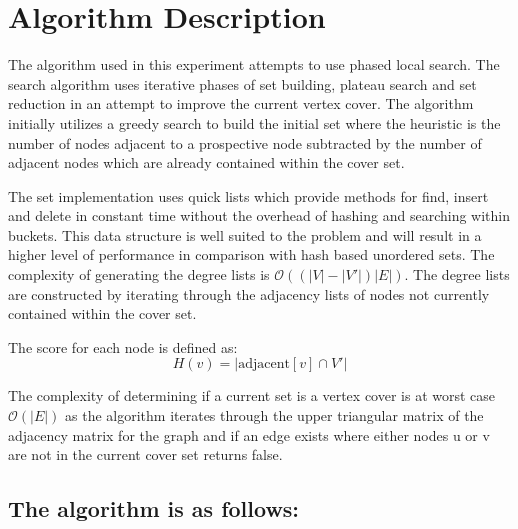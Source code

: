 \documentclass[conference,letterpaper]{IEEEtran}
\begin{document}
\section{Algorithm Description}
\par The algorithm used in this experiment attempts to use phased local search. The search algorithm uses iterative phases of set building, plateau search and set reduction in an attempt to improve the current vertex cover. The algorithm initially utilizes a greedy search to build the initial set where the heuristic is the number of nodes adjacent to a prospective node subtracted by the number of adjacent nodes which are already contained within the cover set.
\par The set implementation uses quick lists which provide methods for find, insert and delete in constant time without the overhead of hashing and searching within buckets. This data structure is well suited to the problem and will result in a higher level of performance in comparison with hash based unordered sets. The complexity of generating the degree lists is $\mathcal{O}((|V| - |V\prime|)|E|)$. The degree lists are constructed by iterating through the adjacency lists of nodes not currently contained within the cover set. 
\par The score for each node is defined as:
\begin{equation}
    H(v)=|\mbox{adjacent}[v] \cap V\prime|
\end{equation}
\par The complexity of determining if a current set is a vertex cover is at worst case $\mathcal{O}(|E|)$ as the algorithm iterates through the upper triangular matrix of the adjacency matrix for the graph and if an edge exists where either nodes u or v are not in the current cover set returns false.

\subsection{The algorithm is as follows:}

\end{document}
